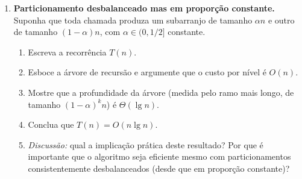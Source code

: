 \documentclass[9pt,a4paper]{extarticle}
\begin{document}
\begin{enumerate}[resume]
\begin{enumerate}
        \item \textbf{Particionamento desbalanceado mas em proporção constante.} Suponha que toda chamada produza um subarranjo de tamanho $\alpha n$ e outro de tamanho $(1 - \alpha) n$, com $\alpha \in (0, 1/2]$ constante.
        \begin{enumerate}
            \item Escreva a recorrência $T(n)$.
            \item Esboce a árvore de recursão e argumente que o custo por nível é $O(n)$.
            \item Mostre que a profundidade da árvore (medida pelo ramo mais longo, de tamanho $(1 - \alpha)^k n$) é $\Theta(\lg n)$.
            \item Conclua que $T(n) = O(n \lg n)$.
            \item \textit{Discussão:} qual a implicação prática deste resultado? Por que é importante que o algoritmo seja eficiente mesmo com particionamentos consistentemente desbalanceados (desde que em proporção constante)?
        \end{enumerate}

    \end{enumerate}
    
\end{enumerate}
\end{document}
